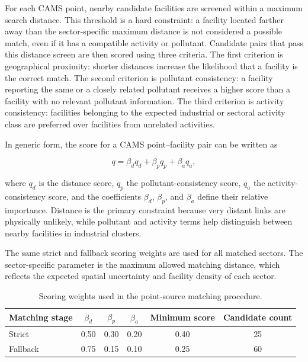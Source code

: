 For each CAMS point, nearby candidate facilities are screened within a
maximum search distance. This threshold is a hard constraint: a facility
located farther away than the sector-specific maximum distance is not
considered a possible match, even if it has a compatible activity or
pollutant. Candidate pairs that pass this distance screen are then scored
using three criteria. The first criterion is geographical proximity:
shorter distances increase the likelihood that a facility is the correct
match. The second criterion is pollutant consistency: a facility
reporting the same or a closely related pollutant receives a higher score
than a facility with no relevant pollutant information. The third
criterion is activity consistency: facilities belonging to the expected
industrial or sectoral activity class are preferred over facilities from
unrelated activities.

In generic form, the score for a CAMS point--facility pair can be written
as

\begin{equation}
  q =
  \beta_d q_d +
  \beta_p q_p +
  \beta_a q_a ,
\end{equation}

where $q_d$ is the distance score, $q_p$ the pollutant-consistency score,
$q_a$ the activity-consistency score, and the coefficients $\beta_d$,
$\beta_p$, and $\beta_a$ define their relative importance. Distance is
the primary constraint because very distant links are physically
unlikely, while pollutant and activity terms help distinguish between
nearby facilities in industrial clusters.

The same strict and fallback scoring weights are used for all matched
sectors. The sector-specific parameter is the maximum allowed
matching distance, which reflects the expected spatial uncertainty and
facility density of each sector.

\begin{table}[htbp]
  \centering
  \caption{Scoring weights used in the point-source matching procedure.}
  \label{tab:point-source-scoring-weights}
  \begin{tabular}{lccccc}
    \toprule
    Matching stage & $\beta_d$ & $\beta_p$ & $\beta_a$ & Minimum score & Candidate count \\
    \midrule
    Strict & 0.50 & 0.30 & 0.20 & 0.40 & 25 \\
    Fallback & 0.75 & 0.15 & 0.10 & 0.25 & 60 \\
    \bottomrule
  \end{tabular}
\end{table}

